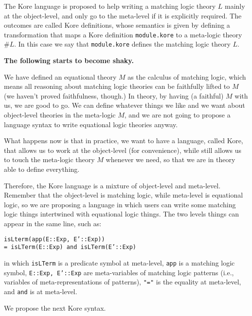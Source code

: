\documentclass[UTF8]{article}
\newcommand{\comment}[1]
    {\par {\bfseries \color{blue} #1 \par}} %
\theoremstyle{plain}
\theoremstyle{definition}
\theoremstyle{remark}
\begin{document}
The Kore language is proposed to help writing a matching logic theory $L$ 
mainly at the object-level, and only go to the meta-level if it is explicitly 
required. The outcomes are called Kore definitions, whose semantics is given by 
defining a transformation that maps a Kore definition \texttt{module.kore} 
to a meta-logic theory $\#L$. In this case we say that \texttt{module.kore} 
defines the matching logic theory $L$. 

\comment{The following starts to become shaky.  

We have defined an equational theory $M$ as the calculus of matching logic,
which means all reasoning about matching logic theories can be faithfully 
lifted to $M$ (we haven't proved faithfulness, though.)
In theory, by having (a faithful) $M$ with us, we are good to go.
We can define whatever things we like and we want about object-level theories 
in the meta-logic $M$, and we are not going to propose a language syntax to 
write equational logic theories anyway. 

What happens now is that in practice, we want to have a language, called Kore, 
that allows us to work at the object-level (for convenience), while still 
allows us to touch the meta-logic theory $M$ whenever we need, so that we are 
in theory able to define everything. 

Therefore, the Kore language is a mixture of object-level and meta-level.
Remember that the object-level is matching logic, while meta-level is 
equational logic, so we are proposing a language in which users can write some 
matching logic things intertwined with equational logic things. 
The two levels things can appear in the same line, such as:

\texttt{isLterm(app(E::Exp, E'::Exp)) \\
    = isLTerm(E::Exp) and isLTerm(E'::Exp)}

in which \texttt{isLTerm} is a predicate symbol at meta-level, \texttt{app} is 
a matching logic symbol, \texttt{E::Exp, E'::Exp} are meta-variables of 
matching logic patterns (i.e., variables of meta-representations of patterns), 
\texttt{"="} is the equality at meta-level, and \texttt{and} is at meta-level.

}

We propose the next Kore syntax. 
\end{document}
